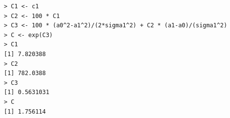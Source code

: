 \documentclass[14pt,a4paper]{scrartcl}
\begin{document}
\begin{verbatim}
> C1 <- c1
> C2 <- 100 * C1
> C3 <- 100 * (a0^2-a1^2)/(2*sigma1^2) + C2 * (a1-a0)/(sigma1^2)
> C <- exp(C3)
> C1
[1] 7.820388
> C2
[1] 782.0388
> C3
[1] 0.5631031
> C
[1] 1.756114
\end{verbatim}

\begin{figure}[h]
	\label{ris:neyman-pearson}
\end{figure}
\end{document}
